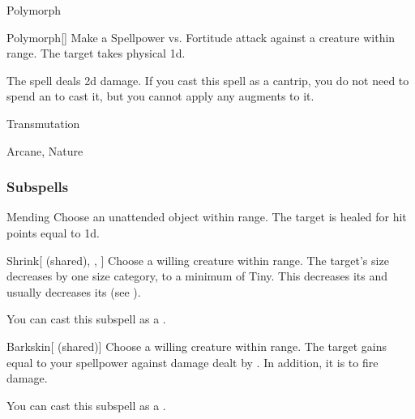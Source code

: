 \newpage
\begin{spellsection}{Polymorph}

\begin{spellheader}
\end{spellheader}


\begin{ability}{Polymorph}[]
Make a Spellpower vs. Fortitude attack against a creature within \rngmed range.
\hit The target takes physical  \plus1d.
\end{ability}



 The spell deals \minus2d damage. If you cast this spell as a cantrip,
you do not need to spend an  to cast it,
but you cannot apply any augments to it.


 Transmutation

 Arcane, Nature
\end{spellsection}


\subsubsection{Subspells}


\begin{ability}[\nth{1}]{Mending}
Choose an unattended object within \rngclose range.
The target is healed for hit points equal to  \plus1d.
\end{ability}
\vspace{0.25em}


\begin{ability}[\nth{1}]{Shrink}[ (shared), , ]
Choose a willing creature within \rngclose range.
The target's size decreases by one size category, to a minimum of Tiny.
This decreases its  and usually decreases its  (see ).

You can cast this subspell as a .
\end{ability}
\vspace{0.25em}


\begin{ability}[\nth{2}]{Barkskin}[ (shared)]
Choose a willing creature within \rngclose range.
The target gains  equal to your spellpower against damage dealt by .
In addition, it is  to fire damage.

You can cast this subspell as a .
\end{ability}
\vspace{0.25em}


